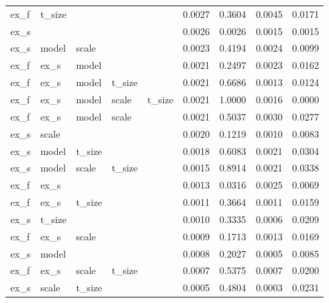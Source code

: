 \begin{table}
\begin{tabular}{lllllrrrr}
   ex\_f &  t\_size &         &         &         &                0.0027 &           0.3604 &         0.0045 &    0.0171 \\
   ex\_s &         &         &         &         &                0.0026 &           0.0026 &         0.0015 &    0.0015 \\
   ex\_s &   model &   scale &         &         &                0.0023 &           0.4194 &         0.0024 &    0.0099 \\
   ex\_f &    ex\_s &   model &         &         &                0.0021 &           0.2497 &         0.0023 &    0.0162 \\
   ex\_f &    ex\_s &   model &  t\_size &         &                0.0021 &           0.6686 &         0.0013 &    0.0124 \\
   ex\_f &    ex\_s &   model &   scale &  t\_size &                0.0021 &           1.0000 &         0.0016 &    0.0000 \\
   ex\_f &    ex\_s &   model &   scale &         &                0.0021 &           0.5037 &         0.0030 &    0.0277 \\
   ex\_s &   scale &         &         &         &                0.0020 &           0.1219 &         0.0010 &    0.0083 \\
   ex\_s &   model &  t\_size &         &         &                0.0018 &           0.6083 &         0.0021 &    0.0304 \\
   ex\_s &   model &   scale &  t\_size &         &                0.0015 &           0.8914 &         0.0021 &    0.0338 \\
   ex\_f &    ex\_s &         &         &         &                0.0013 &           0.0316 &         0.0025 &    0.0069 \\
   ex\_f &    ex\_s &  t\_size &         &         &                0.0011 &           0.3664 &         0.0011 &    0.0159 \\
   ex\_s &  t\_size &         &         &         &                0.0010 &           0.3335 &         0.0006 &    0.0209 \\
   ex\_f &    ex\_s &   scale &         &         &                0.0009 &           0.1713 &         0.0013 &    0.0169 \\
   ex\_s &   model &         &         &         &                0.0008 &           0.2027 &         0.0005 &    0.0085 \\
   ex\_f &    ex\_s &   scale &  t\_size &         &                0.0007 &           0.5375 &         0.0007 &    0.0200 \\
   ex\_s &   scale &  t\_size &         &         &                0.0005 &           0.4804 &         0.0003 &    0.0231 \\
\bottomrule
\end{tabular}
\end{table}
